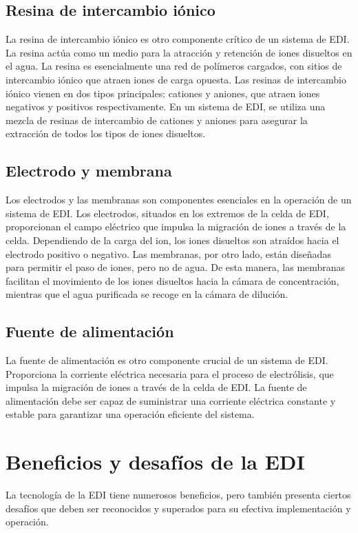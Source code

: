 \subsection{Resina de intercambio iónico}
La resina de intercambio iónico es otro componente crítico de un sistema de EDI. La resina actúa como un medio para la
atracción y retención de iones disueltos en el agua. La resina es esencialmente una red de polímeros cargados, con sitios
de intercambio iónico que atraen iones de carga opuesta. Las resinas de intercambio iónico vienen en dos tipos principales:
cationes y aniones, que atraen iones negativos y positivos respectivamente. En un sistema de EDI, se utiliza una mezcla de
resinas de intercambio de cationes y aniones para asegurar la extracción de todos los tipos de iones disueltos. \\

\subsection{Electrodo y membrana}
Los electrodos y las membranas son componentes esenciales en la operación de un sistema de EDI. Los electrodos, situados en
los extremos de la celda de EDI, proporcionan el campo eléctrico que impulsa la migración de iones a través de la celda.
Dependiendo de la carga del ion, los iones disueltos son atraídos hacia el electrodo positivo o negativo. Las membranas,
por otro lado, están diseñadas para permitir el paso de iones, pero no de agua. De esta manera, las membranas facilitan el
movimiento de los iones disueltos hacia la cámara de concentración, mientras que el agua purificada se recoge en la cámara
de dilución. \\

\subsection{Fuente de alimentación}
La fuente de alimentación es otro componente crucial de un sistema de EDI. Proporciona la corriente eléctrica necesaria
para el proceso de electrólisis, que impulsa la migración de iones a través de la celda de EDI. La fuente de alimentación
debe ser capaz de suministrar una corriente eléctrica constante y estable para garantizar una operación eficiente del sistema. \\


\section{Beneficios y desafíos de la EDI}
La tecnología de la EDI tiene numerosos beneficios, pero también presenta ciertos desafíos que deben ser reconocidos y
superados para su efectiva implementación y operación. \\

